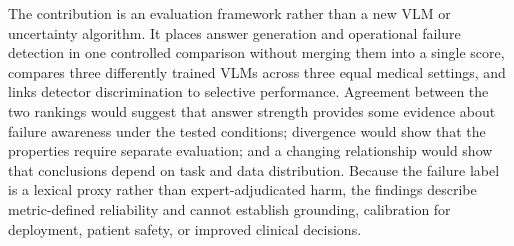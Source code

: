 The contribution is an evaluation framework rather than a new VLM or uncertainty algorithm. It places answer generation and operational failure detection in one controlled comparison without merging them into a single score, compares three differently trained VLMs across three equal medical settings, and links detector discrimination to selective performance. Agreement between the two rankings would suggest that answer strength provides some evidence about failure awareness under the tested conditions; divergence would show that the properties require separate evaluation; and a changing relationship would show that conclusions depend on task and data distribution. Because the failure label is a lexical proxy rather than expert-adjudicated harm, the findings describe metric-defined reliability and cannot establish grounding, calibration for deployment, patient safety, or improved clinical decisions.
